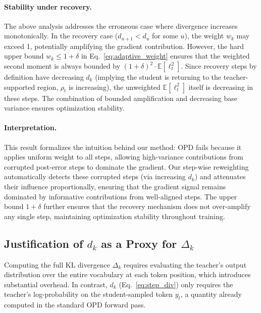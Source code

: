 \paragraph{Stability under recovery.}
The above analysis addresses the erroneous case where divergence increases monotonically. In the recovery case ($d_{u+1} < d_u$ for some $u$), the weight $w_k$ may exceed 1, potentially amplifying the gradient contribution. However, the hard upper bound $w_k \le 1 + \delta$ in Eq.~\eqref{eq:adaptive_weight} ensures that the weighted second moment is always bounded by $(1+\delta)^2 \cdot \mathbb{E}[\ell_t^2]$. Since recovery steps by definition have decreasing $d_k$ (implying the student is returning to the teacher-supported region, \ie $\rho_t$ is increasing), the unweighted $\mathbb{E}[\ell_t^2]$ itself is decreasing in these steps. The combination of bounded amplification and decreasing base variance ensures optimization stability.

\paragraph{Interpretation.}
This result formalizes the intuition behind our method: OPD fails because it applies uniform weight to all steps, allowing high-variance contributions from corrupted post-error steps to dominate the gradient. Our step-wise reweighting automatically detects these corrupted steps (via increasing $d_k$) and attenuates their influence proportionally, ensuring that the gradient signal remains dominated by informative contributions from well-aligned steps. The upper bound $1+\delta$ further ensures that the recovery mechanism does not over-amplify any single step, maintaining optimization stability throughout training.

















\subsection{Justification of $d_k$ as a Proxy for $\Delta_k$}
\label{app:dk_proxy}

Computing the full KL divergence $\Delta_k$ requires evaluating the teacher's output distribution over the entire vocabulary at each token position, which introduces substantial overhead. In contrast, $d_k$ (Eq.~\ref{eq:step_div}) only requires the teacher's log-probability on the student-sampled token $y_t$, a quantity already computed in the standard OPD forward pass.

